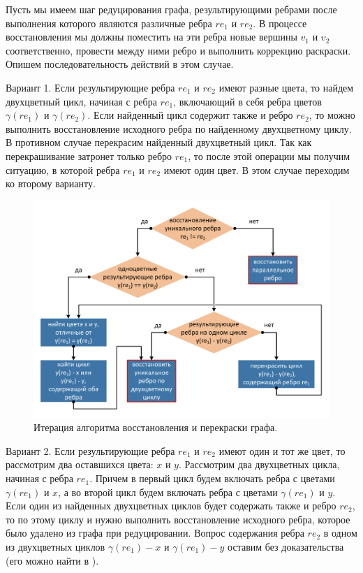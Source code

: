 Пусть мы имеем шаг редуцирования графа, результирующими ребрами после выполнения которого являются различные ребра $re_1$ и $re_2$.
В процессе восстановления мы должны поместить на эти ребра новые вершины $v_1$ и $v_2$ соответственно, провести между ними ребро и выполнить коррекцию раскраски.
Опишем последовательность действий в этом случае.

Вариант 1. Если результирующие ребра $re_1$ и $re_2$ имеют разные цвета, то найдем двухцветный цикл, начиная с ребра $re_1$, включающий в себя ребра цветов $\gamma(re_1)$ и $\gamma(re_2)$.
Если найденный цикл содержит также и ребро $re_2$, то можно выполнить восстановление исходного ребра по найденному двухцветному циклу.
В противном случае перекрасим найденный двухцветный цикл.
Так как перекрашивание затронет только ребро $re_1$, то после этой операции мы получим ситуацию, в которой ребра $re_1$ и $re_2$ имеют один цвет. В этом случае переходим ко второму варианту.

\begin{figure}[ht]
\centering
\includegraphics[width=1.0\textwidth]{./pics/text_3_edge_coloring/7-algorithm.pdf}
\singlespacing
{}\caption{Итерация алгоритма восстановления и перекраски графа.}
\label{fig:text_3_edge_coloring_7}
\end{figure}

Вариант 2. Если результирующие ребра $re_1$ и $re_2$ имеют один и тот же цвет, то рассмотрим два оставшихся цвета: $x$ и $y$.
Рассмотрим два двухцветных цикла, начиная с ребра $re_1$.
Причем в первый цикл будем включать ребра с цветами $\gamma(re_1)$ и $x$, а во второй цикл будем включать ребра с цветами $\gamma(re_1)$ и $y$.
Если один из найденных двухцветных циклов будет содержать также и ребро $re_2$, то по этому циклу и нужно выполнить восстановление исходного ребра, которое было удалено из графа при редуцировании.
Вопрос содержания ребра $re_2$ в одном из двухцветных циклов $\gamma(re_1) - x$ и $\gamma(re_1) - y$ оставим без доказательства (его можно найти в \cite{Kurapov2018}).

